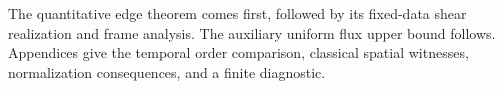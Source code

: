 \documentclass[11pt]{article}
\theoremstyle{definition}
\begin{document}
The quantitative edge theorem comes first, followed by its fixed-data
shear realization and frame analysis. The auxiliary uniform flux upper
bound follows. Appendices give the temporal order comparison, classical
spatial witnesses, normalization consequences, and a finite diagnostic.







\appendix





\begingroup
\small
\setlength{\bibsep}{4pt}


\endgroup
\end{document}
